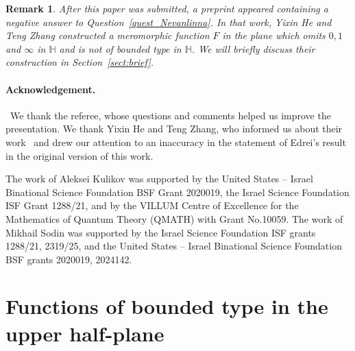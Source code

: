 \documentclass[12pt]{paper}
\newtheorem{remark}[theorem]{Remark}
\newcommand{\bH}{\mathbb H}
\begin{document}
\begin{remark}
\rm After this paper was submitted, a preprint \cite{HZ} appeared 
containing a negative answer to Question~\ref{quest_Nevanlinna}.
In that work, Yixin He and Teng Zhang  constructed a meromorphic function $F$ 
in the plane which omits $0,1$ and $\infty$ in $\bH$ and is not of bounded type in $\bH$.
We will briefly discuss their construction in Section~\ref{sect:brief}.
\end{remark}




\paragraph*{Acknowledgement.}\ 
We thank the referee, whose questions and comments helped us improve the presentation.
We thank Yixin He and Teng Zhang, who informed us about their work~\cite{HZ} and
drew our attention to an inaccuracy in the statement of Edrei's result in the original version of this work. 


The work of Aleksei Kulikov was supported by the United States – Israel Binational Science Foundation 
BSF Grant 2020019, the Israel Science Foundation ISF Grant 1288/21, and by the VILLUM Centre of Excellence 
for the Mathematics of Quantum Theory (QMATH) with Grant No.10059.  
The work of Mikhail Sodin was supported by the Israel Science Foundation ISF grants 1288/21, 2319/25,
and the United States – Israel Binational Science Foundation BSF grants 2020019, 2024142.



\section{Functions of bounded type in the upper half-plane}
\end{document}
